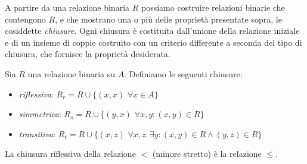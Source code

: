 A partire da una relazione binaria $R$ possiamo costruire relazioni binarie che contengono $R$, e che mostrano una o più delle proprietà presentate sopra, le cosiddette \emph{chiusure}.
Ogni chiusura è costituita dall'unione della relazione iniziale e di un insieme di coppie costruito con un criterio differente a seconda del tipo di chiusura, che fornisce la proprietà desiderata.
\begin{definition}
	Sia $R$ una relazione binaria su $A$.
    Definiamo le seguenti chiusure:
    \begin{itemize}
        \item \emph{riflessiva}: $R_r = R \cup \{(x,x) \,\, \forall x \in A\}$
        \item \emph{simmetrica}: $R_s = R \cup \{(y,x) \,\, \forall x,y : (x,y) \in R\}$
        \item \emph{transitiva}: $R_t = R \cup \{(x,z) \,\, \forall x,z : \exists y : (x,y) \in R \land (y,z) \in R\}$
    \end{itemize}
\end{definition}
\begin{example}
    La chiusura riflessiva della relazione $<$ (minore stretto) è la relazione $\leq$.
\end{example}

